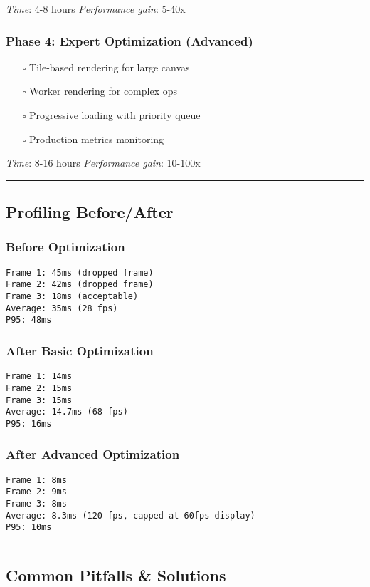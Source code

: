 \documentclass[11pt]{article}
\begin{document}
\emph{Time}: 4-8 hours
\emph{Performance gain}: 5-40x
\subsubsection{Phase 4: Expert Optimization (Advanced)}
\label{sec:orga221dfa}
\begin{itemize}
\item[{$\square$}] Tile-based rendering for large canvas
\item[{$\square$}] Worker rendering for complex ops
\item[{$\square$}] Progressive loading with priority queue
\item[{$\square$}] Production metrics monitoring
\end{itemize}

\emph{Time}: 8-16 hours
\emph{Performance gain}: 10-100x

\noindent\rule{\textwidth}{0.5pt}
\subsection{Profiling Before/After}
\label{sec:orgc144670}

\subsubsection{Before Optimization}
\label{sec:org3d600ba}
\begin{verbatim}
Frame 1: 45ms (dropped frame)
Frame 2: 42ms (dropped frame)
Frame 3: 18ms (acceptable)
Average: 35ms (28 fps)
P95: 48ms
\end{verbatim}
\subsubsection{After Basic Optimization}
\label{sec:org272ef01}
\begin{verbatim}
Frame 1: 14ms
Frame 2: 15ms
Frame 3: 15ms
Average: 14.7ms (68 fps)
P95: 16ms
\end{verbatim}
\subsubsection{After Advanced Optimization}
\label{sec:org4915df1}
\begin{verbatim}
Frame 1: 8ms
Frame 2: 9ms
Frame 3: 8ms
Average: 8.3ms (120 fps, capped at 60fps display)
P95: 10ms
\end{verbatim}

\noindent\rule{\textwidth}{0.5pt}
\subsection{Common Pitfalls \& Solutions}
\label{sec:orgf6b2fca}
\end{document}
